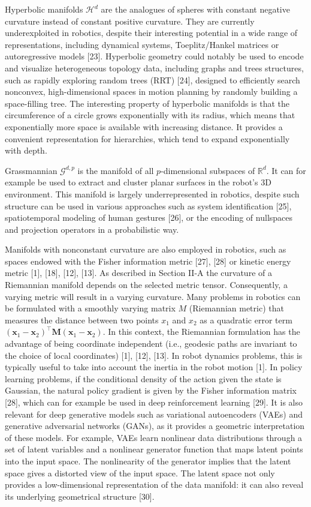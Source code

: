 \documentclass[10pt]{article}
\begin{document}
Hyperbolic manifolds $\mathcal{H}^{d}$ are the analogues of spheres with constant negative curvature instead of constant positive curvature. They are currently underexploited in robotics, despite their interesting potential in a wide range of representations, including dynamical systems, Toeplitz/Hankel matrices or autoregressive models [23]. Hyperbolic geometry could notably be used to encode and visualize heterogeneous topology data, including graphs and trees structures, such as rapidly exploring random trees (RRT) [24], designed to efficiently search nonconvex, high-dimensional spaces in motion planning by randomly building a space-filling tree. The interesting property of hyperbolic manifolds is that the circumference of a circle grows exponentially with its radius, which means that exponentially more space is available with increasing distance. It provides a convenient representation for hierarchies, which tend to expand exponentially with depth.

Grassmannian $\mathcal{G}^{d, p}$ is the manifold of all $p$-dimensional subspaces of $\mathbb{R}^{d}$. It can for example be used to extract and cluster planar surfaces in the robot's 3D environment. This manifold is largely underrepresented in robotics, despite such structure can be used in various approaches such as system identification [25], spatiotemporal modeling of human gestures [26], or the encoding of nullspaces and projection operators in a probabilistic way.

Manifolds with nonconstant curvature are also employed in robotics, such as spaces endowed with the Fisher information metric [27], [28] or kinetic energy metric [1], [18], [12], [13]. As described in Section II-A the curvature of a Riemannian manifold depends on the selected metric tensor. Consequently, a varying metric will result in a varying curvature. Many problems in robotics can be formulated with a smoothly varying matrix $M$ (Riemannian metric) that measures the distance between two points $x_{1}$ and $x_{2}$ as a quadratic error term $\left(\boldsymbol{x}_{1}-\boldsymbol{x}_{2}\right)^{\top} \boldsymbol{M}\left(\boldsymbol{x}_{1}-\boldsymbol{x}_{2}\right)$. In this context, the Riemannian formulation has the advantage of being coordinate independent (i.e., geodesic paths are invariant to the choice of local coordinates) [1], [12], [13]. In robot dynamics problems, this is typically useful to take into account the inertia in the robot motion [1]. In policy learning problems, if the conditional density of the action given the state is Gaussian, the natural policy gradient is given by the Fisher information matrix [28], which can for example be used in deep reinforcement learning [29]. It is also relevant for deep generative models such as variational autoencoders (VAEs) and generative adversarial networks (GANs), as it provides a geometric interpretation of these models. For example, VAEs learn nonlinear data distributions through a set of latent variables and a nonlinear generator function that maps latent points into the input space. The nonlinearity of the generator implies that the latent space gives a distorted view of the input space. The latent space not only provides a low-dimensional representation of the data manifold: it can also reveal its underlying geometrical structure [30].
\end{document}
